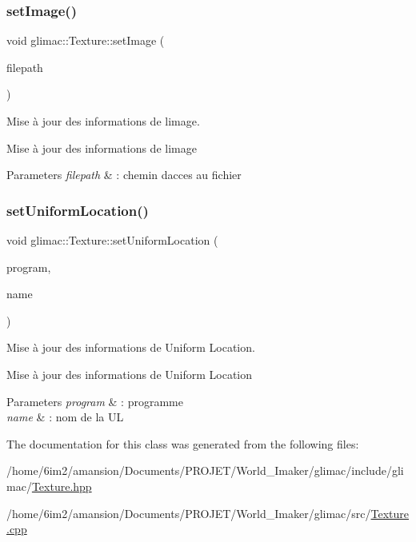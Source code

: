 \subsubsection{\texorpdfstring{set\+Image()}{setImage()}}
{\footnotesize\ttfamily void glimac\+::\+Texture\+::set\+Image (\begin{DoxyParamCaption}\item[{const \hyperlink{classglimac_1_1FilePath}{File\+Path} \&}]{filepath }\end{DoxyParamCaption})}



Mise à jour des informations de l\textquotesingle{}image. 

Mise à jour des informations de l\textquotesingle{}image


\begin{DoxyParams}{Parameters}
{\em filepath} & \+: chemin d\textquotesingle{}acces au fichier \\
\hline
\end{DoxyParams}
\mbox{\label{classglimac_1_1Texture_a2a1e06217a8c98f4ddd7c271b7590c03}} 
\subsubsection{\texorpdfstring{set\+Uniform\+Location()}{setUniformLocation()}}
{\footnotesize\ttfamily void glimac\+::\+Texture\+::set\+Uniform\+Location (\begin{DoxyParamCaption}\item[{\hyperlink{classglimac_1_1Program}{Program} \&}]{program,  }\item[{const G\+Lchar $\ast$}]{name }\end{DoxyParamCaption})}



Mise à jour des informations de Uniform Location. 

Mise à jour des informations de Uniform Location


\begin{DoxyParams}{Parameters}
{\em program} & \+: programme \\
\hline
{\em name} & \+: nom de la UL \\
\hline
\end{DoxyParams}


The documentation for this class was generated from the following files\+:\begin{DoxyCompactItemize}
\item 
/home/6im2/amansion/\+Documents/\+P\+R\+O\+J\+E\+T/\+World\+\_\+\+Imaker/glimac/include/glimac/\hyperlink{Texture_8hpp}{Texture.\+hpp}\item 
/home/6im2/amansion/\+Documents/\+P\+R\+O\+J\+E\+T/\+World\+\_\+\+Imaker/glimac/src/\hyperlink{Texture_8cpp}{Texture.\+cpp}\end{DoxyCompactItemize}
